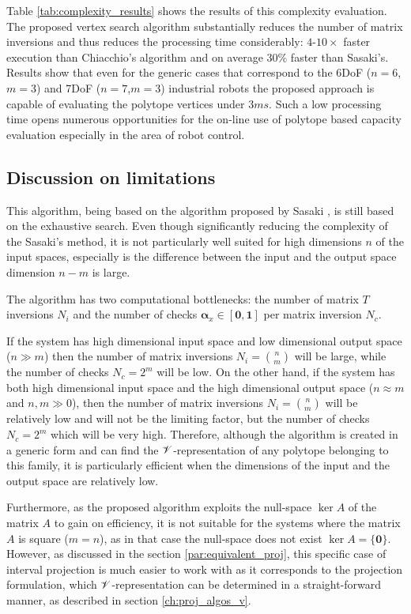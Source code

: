 Table \ref{tab:complexity_results} shows the results of this complexity evaluation. The proposed vertex search algorithm substantially reduces the number of matrix inversions and thus reduces the processing time considerably: $4$-$10\times$ faster execution than Chiacchio's algorithm and on average 30\% faster than Sasaki's. Results show that even for the generic cases that correspond to the 6DoF ($n=6$,$m=3$) and 7DoF ($n=7$,$m=3$) industrial robots the proposed approach is capable of evaluating the polytope vertices under $3ms$. Such a low processing time opens numerous opportunities for the on-line use of polytope based capacity evaluation especially in the area of robot control.

\subsection{Discussion on limitations}
This algorithm, being based on the algorithm proposed by Sasaki \cite{sasaki2011vertex}, is still based on the exhaustive search. Even though significantly reducing the complexity of the Sasaki's method, it is not particularly well suited for high dimensions $n$ of the input spaces, especially is the difference between the input and the output space dimension $n\!-\!m$ is large. 

The algorithm has two computational bottlenecks: the number of matrix $T$ inversions $N_i$ and the number of checks $\bm{\alpha}_x \in [\bm{0},\bm{1}]$ per matrix inversion $N_c$.

If the system has high dimensional input space and low dimensional output space ($n\gg m$) then the number of matrix inversions $N_i=\binom{n}{m}$ will be large, while the number of checks $N_c=2^m$  will be low. 
On the other hand, if the system has both high dimensional input space and the high dimensional output space ($n\approx m$ and $n,m\gg0$), then the number of matrix inversions $N_i=\binom{n}{m}$ will be relatively low and will not be the limiting factor, but the number of checks $N_c=2^m$ which will be very high. Therefore, although the algorithm is created in a generic form and can find the $\mathscr{V}$-representation of any polytope belonging to this family, it is particularly efficient when the dimensions of the input and the output space are relatively low. 

Furthermore, as the proposed algorithm exploits the null-space $\ker{A}$ of the matrix $A$ to gain on efficiency, it is not suitable for the systems where the matrix $A$ is square ($m\!=\!n$), as in that case the null-space does not exist $\ker{A}=\{\bm{0}\}$. However, as discussed in the section \ref{par:equivalent_proj}, this specific case of interval projection is much easier to work with as it corresponds to the projection formulation, which $\mathscr{V}$-representation can be determined in a straight-forward manner, as described in section \ref{ch:proj_algos_v}.

